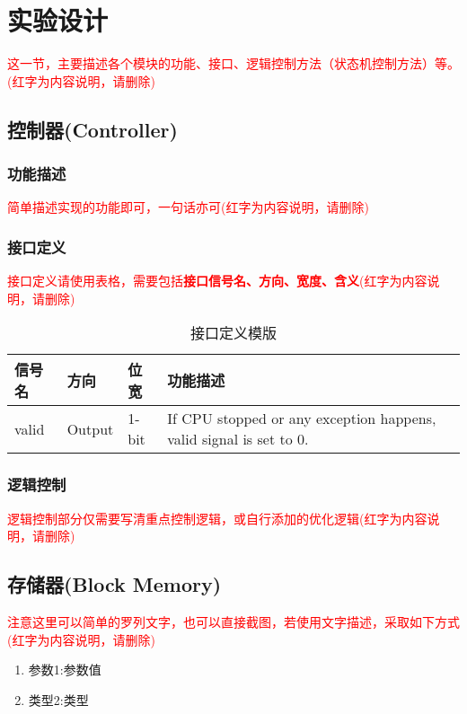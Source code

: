 \section{实验设计}
\textcolor{red}{这一节，主要描述各个模块的功能、接口、逻辑控制方法（状态机控制方法）等。(红字为内容说明，请删除)}
\subsection{控制器(Controller)}\label{sub:controller}
\subsubsection{功能描述}
\textcolor{red}{简单描述实现的功能即可，一句话亦可(红字为内容说明，请删除)}
\subsubsection{接口定义}
\textcolor{red}{接口定义请使用表格，需要包括\textbf{接口信号名、方向、宽度、含义}(红字为内容说明，请删除)}

\begin{table}[htp]
\caption{接口定义模版}\label{tab:signaldef}
\begin{center}
	\begin{tabular}{|l|l|l|p{6cm}|}
	\hline
	\textbf{信号名} & \textbf{方向} & \textbf{位宽} & \textbf{功能描述}\\ \hline \hline
	valid			& Output& 1-bit & If CPU stopped or any exception happens, valid signal is set to 0.\\ 
	\hline
	\end{tabular}
\end{center}
\end{table}
\subsubsection{逻辑控制}
\textcolor{red}{逻辑控制部分仅需要写清重点控制逻辑，或自行添加的优化逻辑(红字为内容说明，请删除)}

\subsection{存储器(Block Memory)}\label{sub:ctl}
\textcolor{red}{注意这里可以简单的罗列文字，也可以直接截图，若使用文字描述，采取如下方式(红字为内容说明，请删除)}
\begin{enumerate}
    \item 参数1:参数值 
    \item 类型2:类型
\end{enumerate}
